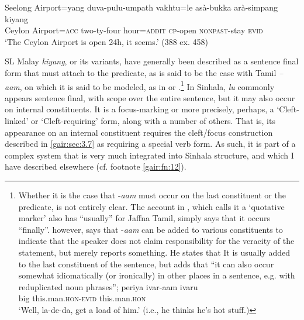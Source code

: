 \ea\label{ex3.9.2} 
\gll Seelong Airport=yang duva-pulu-umpath vakhtu=le asà-bukka arà-simpang kiyang\\
 Ceylon Airport=\textsc{acc} two-ty-four  hour=\textsc{addit} \textsc{cp}-open  \textsc{nonpast}-stay \textsc{evid}\\
 `The Ceylon Airport is open 24h, it seems.' (388 ex. 458)
\z


 SL Malay \textit{kiyang}, or its variants, have generally been described as a sentence final form that must attach to the predicate, as is said to be the case with Tamil \textit{--aam}, on which it is said to be modeled, as in \citet[142]{Bakker2006} or \citet[175]{SmithEtAl2006cll}.\footnote{Whether
  it is the case that -\textit{aam} must occur on the last constituent or the predicate, is not entirely clear. The account in \citet[214]{GairEtAl1978}, which calls it a `quotative marker' also has ``usually'' \citet[148]{Suseendirarajah1993} for Jaffna Tamil, simply says that it occurs ``finally''. \citet[151]{Schiffman1999} however, says that -\textit{aam} can be added to various constituents to indicate that the speaker does not claim responsibility for the veracity of the statement, but merely reports something. He states that It is usually added to the last constituent of the sentence, but adds that ``it can also occur somewhat idiomatically (or ironically) in other places in a sentence, e.g. with reduplicated noun phrases'';
  \ea  
  \gll periya ivar-aam ivaru\\ 
	big this.man.\textsc{hon}-\textsc{evid} this.man.\textsc{hon}\\
       `Well, la-de-da, get a load of him.' (i.e., he thinks he's hot stuff.)
   \z
}
In Sinhala, \textit{lu} commonly appears sentence final, with scope over the entire sentence, but it may also occur on internal constituents.  It is a focus-marking or more precisely, perhaps, a `Cleft-linked' or `Cleft-requiring' form, along with a number of others. That is, its appearance on an internal constituent requires the cleft/focus construction described in  \ref{gair:sec:3.7} as requiring a special verb form. As such, it is part of a complex system that is very much integrated into Sinhala structure, and which I have described elsewhere (cf. footnote \ref{gair:fn:12}).
